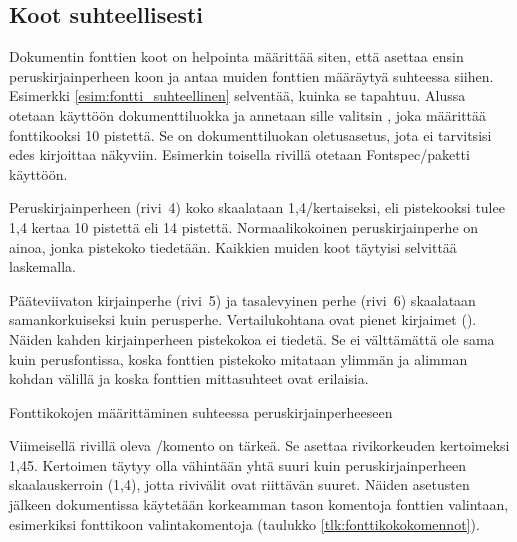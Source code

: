 \subsection{Koot suhteellisesti}
\label{luku:fontti_suhteellinen}

Dokumentin fonttien koot on helpointa määrittää siten, että asettaa
ensin peruskirjainperheen koon ja antaa muiden fonttien määräytyä
suhteessa siihen. Esimerkki \ref{esim:fontti_suhteellinen} selventää,
kuinka se tapahtuu. Alussa otetaan käyttöön dokumenttiluokka
 ja annetaan sille valitsin \koodi{10pt}, joka määrittää
fonttikooksi 10 pistettä. Se on dokumenttiluokan ole\-tus\-ase\-tus,
jota ei tarvitsisi edes kirjoittaa näkyviin. Esimerkin toisella rivillä
otetaan Fontspec\-/paketti käyttöön.

Peruskirjainperheen (rivi~4) koko skaalataan 1,4\-/kertaiseksi, eli
pistekooksi tulee 1,4 kertaa 10 pistettä eli 14 pistettä.
Normaalikokoinen peruskirjainperhe on ainoa, jonka pistekoko tiedetään.
Kaikkien muiden koot täytyisi selvittää laskemalla.

Pääteviivaton kirjainperhe (rivi~5) ja tasalevyinen perhe (rivi~6)
skaalataan samankorkuiseksi kuin perusperhe. Vertailukohtana ovat pienet
kirjaimet (). Näiden kahden kirjainperheen
pistekokoa ei tiedetä. Se ei välttämättä ole sama kuin perusfontissa,
koska fonttien pistekoko mitataan ylimmän ja alimman kohdan välillä ja
koska fonttien mittasuhteet ovat erilaisia.

\begin{esimerkki}
\caption{Fonttikokojen määrittäminen suhteessa peruskirjainperheeseen}
\label{esim:fontti_suhteellinen}
\end{esimerkki}

Viimeisellä rivillä oleva \-/komento on tärkeä.
Se asettaa rivikorkeuden kertoimeksi 1,45. Kertoimen täytyy olla
vähintään yhtä suuri kuin peruskirjainperheen skaalauskerroin (1,4),
jotta rivivälit ovat riittävän suuret. Näiden asetusten jälkeen
dokumentissa käytetään korkeamman tason komentoja fonttien valintaan,
esimerkiksi fonttikoon valintakomentoja  (taulukko \ref{tlk:fonttikokokomennot}).

